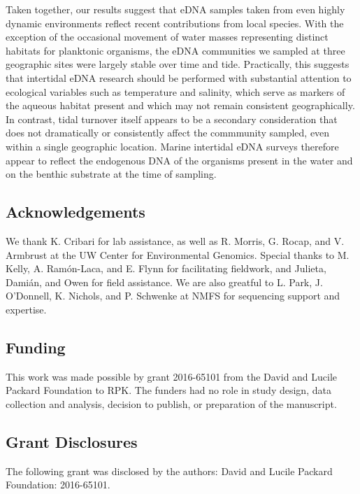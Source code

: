 \documentclass[fleqn,10pt,lineno]{wlpeerj} %
\begin{document}
Taken together, our results suggest that eDNA samples taken from even
highly dynamic environments reflect recent contributions from local
species. With the exception of the occasional movement of water masses
representing distinct habitats for planktonic organisms, the eDNA
communities we sampled at three geographic sites were largely stable
over time and tide. Practically, this suggests that intertidal eDNA
research should be performed with substantial attention to ecological
variables such as temperature and salinity, which serve as markers of
the aqueous habitat present and which may not remain consistent
geographically. In contrast, tidal turnover itself appears to be a
secondary consideration that does not dramatically or consistently
affect the commmunity sampled, even within a single geographic location.
Marine intertidal eDNA surveys therefore appear to reflect the
endogenous DNA of the organisms present in the water and on the benthic
substrate at the time of sampling.

\subsection{Acknowledgements}\label{acknowledgements}

We thank K. Cribari for lab assistance, as well as R. Morris, G. Rocap,
and V. Armbrust at the UW Center for Environmental Genomics. Special
thanks to M. Kelly, A. Ramón-Laca, and E. Flynn for facilitating
fieldwork, and Julieta, Damián, and Owen for field assistance. We are
also greatful to L. Park, J. O'Donnell, K. Nichols, and P. Schwenke at
NMFS for sequencing support and expertise.

\subsection{Funding}\label{funding}

This work was made possible by grant 2016-65101 from the David and
Lucile Packard Foundation to RPK. The funders had no role in study
design, data collection and analysis, decision to publish, or
preparation of the manuscript.

\subsection{Grant Disclosures}\label{grant-disclosures}

The following grant was disclosed by the authors: David and Lucile
Packard Foundation: 2016-65101.
\end{document}
